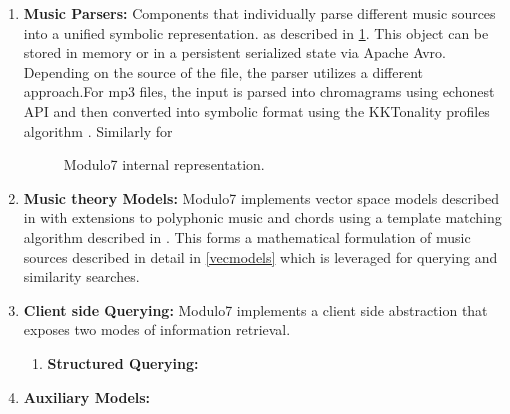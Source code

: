 \documentclass{article}
\begin{document}
\begin{enumerate}
\item \textbf{Music Parsers: } Components that individually parse different music sources into a unified symbolic representation. as described in \ref{fig:document}. This object can be stored in memory or in a persistent serialized state via Apache Avro. Depending on the source of the file, the parser utilizes a different approach.For mp3 files, the input is parsed into chromagrams using echonest API and then converted into symbolic format using the KKTonality profiles algorithm \cite{kkTonalityKeyFinding}. Similarly for 

\begin{figure}
 \centerline{}
 \caption{Modulo7 internal representation.}
 \label{fig:document}
\end{figure}

\item \textbf{Music theory Models: } Modulo7 implements vector space models described in \cite{similie} with extensions to polyphonic music and chords using a template matching algorithm described in \cite{chord-detection}. This forms a mathematical formulation of music sources described in detail in \ref{vecmodels} which is leveraged for querying and similarity searches.

\item \textbf{Client side Querying: } Modulo7 implements a client side abstraction that exposes two modes of information retrieval. 
\begin{enumerate}
\item \textbf{Structured Querying: } 
\end{enumerate}

\item \textbf{Auxiliary Models: }


\end{enumerate}
\end{document}
